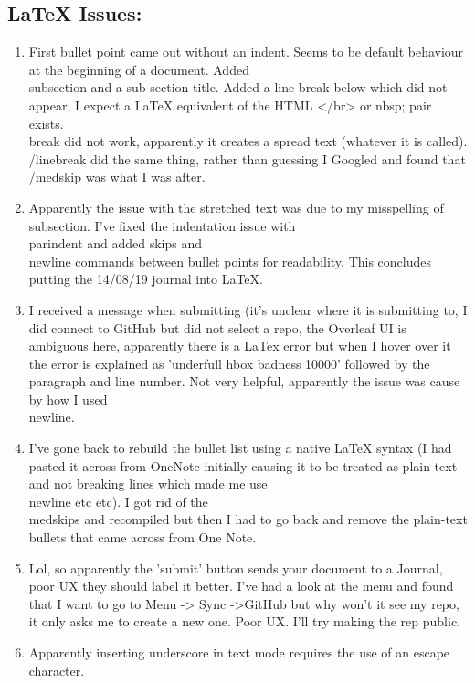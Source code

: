 \documentclass{article}
\begin{document}
\begin{enumerate}
    \section{LaTeX Issues:}
    \begin{enumerate}
        \item First bullet point came out without an indent. Seems to be default behaviour at the beginning of a document. Added \\subsection and a sub section title. Added a line break below which did not appear, I expect a LaTeX equivalent of the HTML </br> or nbsp; pair exists. \\break did not work, apparently it creates a spread text (whatever it is called). /linebreak did the same thing, rather than guessing I Googled and found that /medskip was what I was after.
        \item Apparently the issue with the stretched text was due to my misspelling of \\subsection. I've fixed the indentation issue with \\parindent and added skips and \\newline commands between bullet points for readability. This concludes putting the 14/08/19 journal into LaTeX.
        \item  I received a message when submitting (it's unclear where it is submitting to, I did connect to GitHub but did not select a repo, the Overleaf UI is ambiguous here, apparently there is a LaTex error but when I hover over it the error is explained as 'underfull hbox badness 10000' followed by the paragraph and line number. Not very helpful, apparently the issue was cause by how I used \\newline.
        \item I've gone back to rebuild the bullet list using a native LaTeX syntax (I had pasted it across from OneNote initially causing it to be treated as plain text and not breaking lines which made me use \\newline etc etc). I got rid of the \\medskips and recompiled but then I had to go back and remove the plain-text bullets that came across from One Note.
        \item Lol, so apparently the 'submit' button sends your document to a Journal, poor UX they should label it better. I've had a look at the menu and found that I want to go to Menu -> Sync ->GitHub but why won't it see my repo, it only asks me to create a new one. Poor UX. I'll try making the rep public.
        \item Apparently inserting underscore in text mode requires the use of an escape character.
    \end{enumerate}
\end{enumerate}
\end{document}
